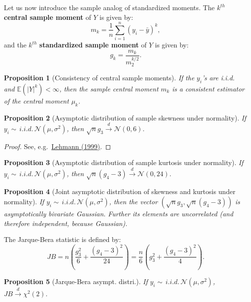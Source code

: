 \documentclass[
  11pt,
]{book}
\newtheorem{proposition}{Proposition}[chapter]
\theoremstyle{definition}
\theoremstyle{definition}
\theoremstyle{definition}
\theoremstyle{definition}
\theoremstyle{remark}
\begin{document}
Let us now introduce the sample analog of standardized moments. The \(k^{th}\) \textbf{central sample moment} of \(Y\) is given by:
\[
m_k = \frac{1}{n}\sum_{i=1}^n(y_i - \bar{y})^k,
\]
and the \(k^{th}\) \textbf{standardized sample moment} of \(Y\) is given by:
\[
g_k = \frac{m_k}{m_2^{k/2}}.
\]

\begin{proposition}[Consistency of central sample moments]
\protect\hypertarget{prp:conssitCentralMoments}{}\label{prp:conssitCentralMoments}If the \(y_i\)'s are i.i.d. and \(\mathbb{E}(|Y|^k)<\infty\), then the sample central moment \(m_k\) is a consistent estimator of the central moment \(\mu_k\).
\end{proposition}

\begin{proposition}[Asymptotic distribution of sample skewness under normality]
\protect\hypertarget{prp:Asymptg3Normal}{}\label{prp:Asymptg3Normal}If \(y_i\sim\,i.i.d.\,\mathcal{N}(\mu,\sigma^2)\), then \(\sqrt{n}g_3 \overset{d}{\rightarrow} \mathcal{N}(0,6)\).
\end{proposition}

\begin{proof}
See, e.g.~\href{http://www.springer.com/la/book/9780387985954}{Lehmann (1999)}.
\end{proof}

\begin{proposition}[Asymptotic distribution of sample kurtosis under normality]
\protect\hypertarget{prp:Asymptg4Normal}{}\label{prp:Asymptg4Normal}If \(y_i\sim\,i.i.d.\,\mathcal{N}(\mu,\sigma^2)\), then \(\sqrt{n}(g_4-3) \overset{d}{\rightarrow} \mathcal{N}(0,24)\).
\end{proposition}

\begin{proposition}[Joint asymptotic distribution of skewness and kurtosis under normality]
\protect\hypertarget{prp:Asymptg3g4Normal}{}\label{prp:Asymptg3g4Normal}If \(y_i\sim\,i.i.d.\,\mathcal{N}(\mu,\sigma^2)\), then the vector \((\sqrt{n}g_3,\sqrt{n}(g_4-3))\) is asymptotically bivariate Gaussian. Further its elements are uncorrelated (and therefore independent, because Gaussian).
\end{proposition}

The Jarque-Bera statistic is defined by:
\[
JB = n \left( \frac{g_3^2}{6}+\frac{(g_4-3)^2}{24} \right) = \frac{n}{6}\left(g_3^2 + \frac{(g_4-3)^2}{4}\right).
\]

\begin{proposition}[Jarque-Bera asympt. distri.]
\protect\hypertarget{prp:JB}{}\label{prp:JB}If \(y_i\sim\,i.i.d.\,\mathcal{N}(\mu,\sigma^2)\), \(JB \overset{d}{\rightarrow} \chi^2(2)\).
\end{proposition}
\end{document}
